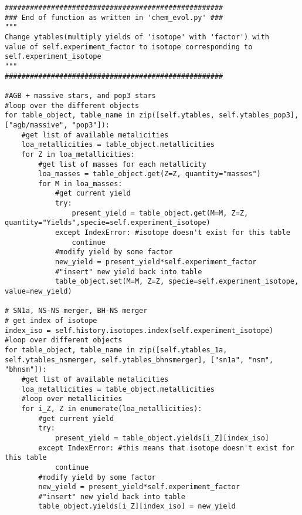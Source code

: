 \begin{lstlisting}[style=custompython, caption={Snippet of code added to the existing function \texttt{\_\_set\_yield\_tables} in \chemevol\ in \omegamodel-framework. The code-snippet multiplies the yield of isotope \texttt{self.experiment\_isotope} with a factor \texttt{self.experiment\_factor} for all yield-tables where the isotope can be found.}]
####################################################
### End of function as written in 'chem_evol.py' ###
""" 
Change ytables(multiply yields of 'isotope' with 'factor') with
value of self.experiment_factor to isotope corresponding to self.experiment_isotope
"""
####################################################

#AGB + massive stars, and pop3 stars
#loop over the different objects
for table_object, table_name in zip([self.ytables, self.ytables_pop3], ["agb/massive", "pop3"]):
    #get list of available metalicities
    loa_metallicities = table_object.metallicities
    for Z in loa_metallicities:
        #get list of masses for each metallicity
        loa_masses = table_object.get(Z=Z, quantity="masses")
        for M in loa_masses:
            #get current yield
            try:
                present_yield = table_object.get(M=M, Z=Z, quantity="Yields",specie=self.experiment_isotope)
            except IndexError: #isotope doesn't exist for this table
                continue
            #modify yield by some factor
            new_yield = present_yield*self.experiment_factor
            #"insert" new yield back into table
            table_object.set(M=M, Z=Z, specie=self.experiment_isotope, value=new_yield)

# SN1a, NS-NS merger, BH-NS merger
# get index of isotope
index_iso = self.history.isotopes.index(self.experiment_isotope)
#loop over different objects
for table_object, table_name in zip([self.ytables_1a, self.ytables_nsmerger, self.ytables_bhnsmerger], ["sn1a", "nsm", "bhnsm"]):
    #get list of available metalicities
    loa_metallicities = table_object.metallicities
    #loop over metallicities
    for i_Z, Z in enumerate(loa_metallicities):
        #get current yield
        try:
            present_yield = table_object.yields[i_Z][index_iso]
        except IndexError: #this means that isotope doesn't exist for this table
            continue
        #modify yield by some factor
        new_yield = present_yield*self.experiment_factor
        #"insert" new yield back into table
        table_object.yields[i_Z][index_iso] = new_yield
\end{lstlisting}
